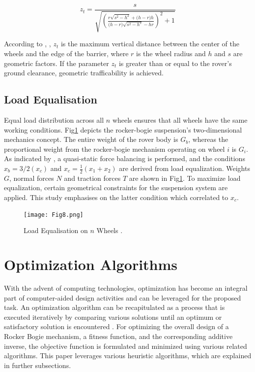 \documentclass[default,iicol]{sn-jnl}
\theoremstyle{thmstyleone}
\theoremstyle{thmstyletwo}
\theoremstyle{thmstylethree}
\begin{document}
\begin{equation}
\displaystyle{z_{t}= \frac{s}{ \sqrt{   \left(\frac{r \sqrt{ s^{2}-h^{2} } + \big(h-r\big)h }{ \big(h-r\big)  \sqrt{ s^{2} - h^{s}} -hr } \right ) ^{2} +1} } }
\end{equation}

According to \cite{bib1}, \cite{bib7}, $z_t$ is the maximum vertical distance between the center of the wheels and the edge of the barrier, where $r$ is the wheel radius and $h$ and $s$ are geometric factors. If the parameter  $z_t$ is greater than or equal to the rover's ground clearance, geometric trafficability is achieved.

\subsection{Load Equalisation}\label{subsec7}

Equal load distribution across all $n$ wheels ensures that all wheels have the same working conditions. Fig\ref{fig8} depicts the rocker-bogie suspension's two-dimensional mechanics concept. The entire weight of the rover body is $G_b$, whereas the proportional weight from the rocker-bogie mechanism operating on wheel $i$ is $G_i$. As indicated by \cite{bib14}, a quasi-static force balancing is performed, and the conditions ${x_{b} = 3/2( x_c)}$ and ${ x_c = \frac{1}{2} (x_1 + x_2)}$ are derived from load equalization. Weights $G$, normal forces $N$ and traction forces $T$ are shown in Fig\ref{fig8}. To maximize load equalization, certain geometrical constraints for the suspension system are applied. This study emphasises on the latter condition which correlated to $x_c$.

\begin{figure}[ht]
\centering
\texttt{[image: Fig8.png]}
\caption{Load Equalisation on $n$ Wheels \cite{bib1}.}\label{fig8}
\end{figure}


\section{Optimization Algorithms}\label{sec3}

With the advent of computing technologies, optimization has become an integral part of computer-aided design activities and can be leveraged for the proposed task. An optimization algorithm can be recapitulated as a process that is executed iteratively by comparing various solutions until an optimum or satisfactory solution is encountered \cite{bib15}. For optimizing the overall design of a Rocker Bogie mechanism, a fitness function, and the corresponding additive inverse, the objective function is formulated and minimized using various related algorithms. This paper leverages various heuristic algorithms, which are explained in further subsections.
\end{document}

